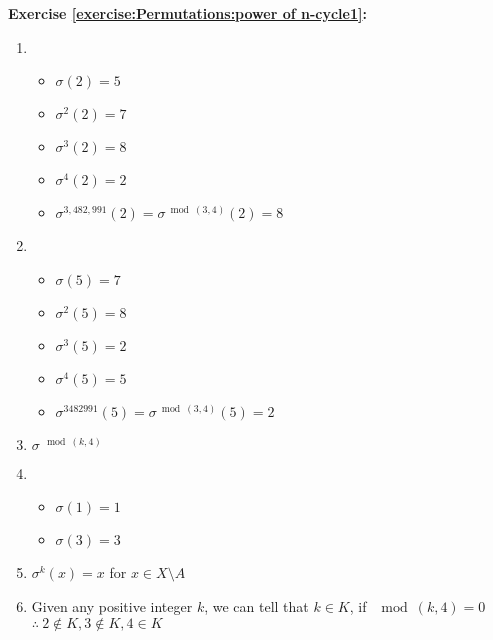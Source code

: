 \noindent\textbf{Exercise \ref{exercise:Permutations:power of n-cycle1}:} %
\begin{enumerate}[{a.}]
\item
	\begin{itemize}
	\item
	$\sigma(2) = 5$
	
	\item
	$\sigma^2(2) = 7$
	
	\item
	$\sigma^3(2) = 8$
	
	\item
	$\sigma^4(2) = 2$
	
	\item
	$\sigma^{3,482,991}(2) = \sigma^{\bmod{(3,4)}}(2) = 8$
	\end{itemize}
	
\item
	\begin{itemize}
	\item
	$\sigma(5) = 7$
	
	\item
	$\sigma^2(5) = 8$
	
	\item
	$\sigma^3(5) = 2$
	
	\item
	$\sigma^4(5) = 5$
	
	\item
	$\sigma^{3482991}(5) = \sigma^{\bmod{(3,4)}}(5) = 2$
	\end{itemize}
	
\item
$\sigma^{\mod(k,4)}$

\item
	\begin{itemize}
	\item
	$\sigma(1) = 1$
	
	\item
	$\sigma(3) = 3$
	\end{itemize}
	
\item
$\sigma^k(x) = x$ for $x\in X\setminus A$

\item 
Given any positive integer $k$, we can tell that $k \in K$, if $\mod(k,4) = 0$\\
$\therefore\ 2\not\in K, 3\not\in K, 4\in K$
\end{enumerate}

